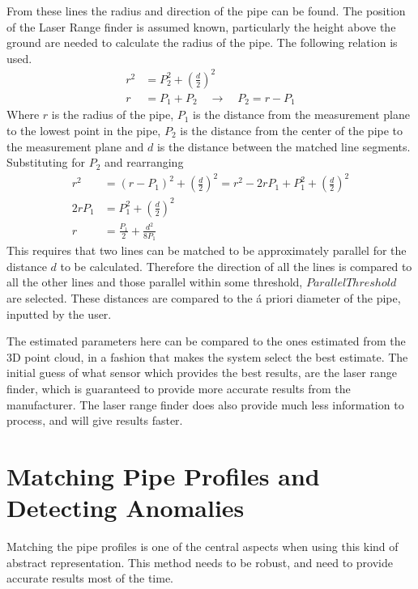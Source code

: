 From these lines the radius and direction of the pipe can be found. The position of the
Laser Range finder is assumed known, particularly the height above the ground are needed
to calculate the radius of the pipe. The following relation is used.
\begin{align}
    r^2 &= P_2^2 + \left(\frac{d}{2} \right)^2 \\
    r &= P_1 + P_2  \quad \rightarrow \quad P_2 = r - P_1
\end{align}
Where $r$ is the radius of the pipe, $P_1$ is the distance from the measurement plane to
the lowest point in the pipe, $P_2$ is the distance from the center of the pipe to the
measurement plane and $d$ is the distance between the matched line segments. Substituting
for $P_2$ and rearranging
\begin{equation}
    \begin{aligned}
        r^2& = (r - P_1)^2 + \left(\frac{d}{2}\right)^2 = r^2 - 2 r P_1 + P_1^2 +
        \left(\frac{d}{2}\right)^2 \\
        2 r P_1 &= P_1^2 + \left(\frac{d}{2}\right)^2 \\
        r &= \frac{P_1}{2} + \frac{d^2}{8 P_1}
    \end{aligned}
\end{equation}
This requires that two lines can be matched to be approximately parallel for the distance
$d$ to be calculated. Therefore the direction of all the lines is compared to all the
other lines and those parallel within some threshold, $ParallelThreshold$ are selected.
These distances are compared to the \'a priori diameter of the pipe, inputted by the user. 

The estimated parameters here can be compared to the ones estimated from the 3D point
cloud, in a fashion that makes the system select the best estimate. The initial guess of
what sensor which provides the best results, are the laser range finder, which is
guaranteed to provide more accurate results from the manufacturer. The laser range finder
does also provide much less information to process, and will give results faster. 


\section{Matching Pipe Profiles and Detecting Anomalies}
Matching the pipe profiles is one of the central aspects when using this kind of abstract
representation. This method needs to be robust, and need to provide accurate results most
of the time.

